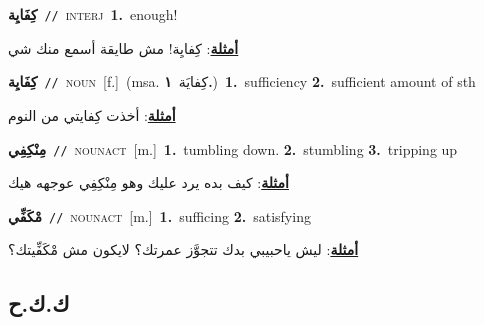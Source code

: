 \documentclass[10pt,a4paper,twoside]{article} %
\begin{document}
\begin{multicols}{2}
{\setlength\topsep{0pt}\textbf{\foreignlanguage{arabic}{كِفَايِة}}\ {\color{gray}\texttt{//}\color{black}}\ \textsc{interj}\ \textbf{1.}~enough!\  \begin{flushright}\color{gray}\foreignlanguage{arabic}{\textbf{\underline{\foreignlanguage{arabic}{أمثلة}}}: كِفايِة! مش طايقة أسمع منك شي}\end{flushright}\color{black}} \vspace{2mm}

{\setlength\topsep{0pt}\textbf{\foreignlanguage{arabic}{كِفَايِة}}\ {\color{gray}\texttt{//}\color{black}}\ \textsc{noun}\ [f.]\ \color{gray}(msa. \foreignlanguage{arabic}{كِفايَة}~\foreignlanguage{arabic}{\textbf{١.}})\color{black}\ \textbf{1.}~sufficiency  \textbf{2.}~sufficient amount of sth\  \begin{flushright}\color{gray}\foreignlanguage{arabic}{\textbf{\underline{\foreignlanguage{arabic}{أمثلة}}}: أخذت كِفايتي من النوم}\end{flushright}\color{black}} \vspace{2mm}

{\setlength\topsep{0pt}\textbf{\foreignlanguage{arabic}{مِنْكِفِي}}\ {\color{gray}\texttt{//}\color{black}}\ \textsc{noun\textunderscore act}\ [m.]\ \textbf{1.}~tumbling down.  \textbf{2.}~stumbling  \textbf{3.}~tripping up\  \begin{flushright}\color{gray}\foreignlanguage{arabic}{\textbf{\underline{\foreignlanguage{arabic}{أمثلة}}}: كيف بده يرد عليك وهو مِنْكِفِي عوجهه هيك}\end{flushright}\color{black}} \vspace{2mm}

{\setlength\topsep{0pt}\textbf{\foreignlanguage{arabic}{مْكَفِّي}}\ {\color{gray}\texttt{//}\color{black}}\ \textsc{noun\textunderscore act}\ [m.]\ \textbf{1.}~sufficing  \textbf{2.}~satisfying\  \begin{flushright}\color{gray}\foreignlanguage{arabic}{\textbf{\underline{\foreignlanguage{arabic}{أمثلة}}}: ليش ياحبيبي بدك تتجوَّز عمرتك؟ لايكون مش مْكَفِّيتك؟}\end{flushright}\color{black}} \vspace{2mm}

\vspace{-3mm}
\subsection*{\color{blue}\foreignlanguage{arabic}{ك.ك.ح}\color{blue}{}} 


\end{multicols}
\end{document}
